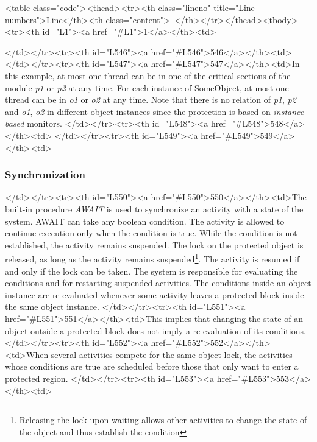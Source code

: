 <table class="code"><thead><tr><th class="lineno" title="Line numbers">Line</th><th class="content"> </th></tr></thead><tbody><tr><th id="L1"><a href="#L1">1</a></th><td>\documentclass[a4paper,11pt]{article}
\begin{document}
</td></tr><tr><th id="L546"><a href="#L546">546</a></th><td>
</td></tr><tr><th id="L547"><a href="#L547">547</a></th><td>In this example, at most one thread can be in one of the critical sections of the module \emph{p1} or \emph{p2} at any time. For each instance of SomeObject, at most one thread can be in \emph{o1} or \emph{o2} at any time. Note that there is no relation of \emph{p1}, \emph{p2} and \emph{o1}, \emph{o2} in different object instances since the protection is based on \emph{instance-based} monitors.
</td></tr><tr><th id="L548"><a href="#L548">548</a></th><td>
</td></tr><tr><th id="L549"><a href="#L549">549</a></th><td>\subsubsection{Synchronization}
</td></tr><tr><th id="L550"><a href="#L550">550</a></th><td>The built-in procedure {\em AWAIT} is used to synchronize an activity with a state of the system. AWAIT can take any boolean condition. The activity is allowed to continue execution only when the condition is true. While the condition is not established, the activity remains suspended. The lock on the protected object is released, as long as the activity remains suspended\footnote{Releasing the lock upon waiting allows other activities to change the state of the object and thus establish the condition}. The activity is resumed if and only if the lock can be taken. The system is responsible for evaluating the conditions and for restarting suspended activities. The conditions inside an object instance are re-evaluated whenever some activity leaves a protected block inside the same object instance.
</td></tr><tr><th id="L551"><a href="#L551">551</a></th><td>This implies that changing the state of an object outside a protected block does not imply a re-evaluation of its conditions.
</td></tr><tr><th id="L552"><a href="#L552">552</a></th><td>When several activities compete for the same object lock, the activities whose conditions are true are scheduled before those that only want to enter a protected region.
</td></tr><tr><th id="L553"><a href="#L553">553</a></th><td>
\end{document}
